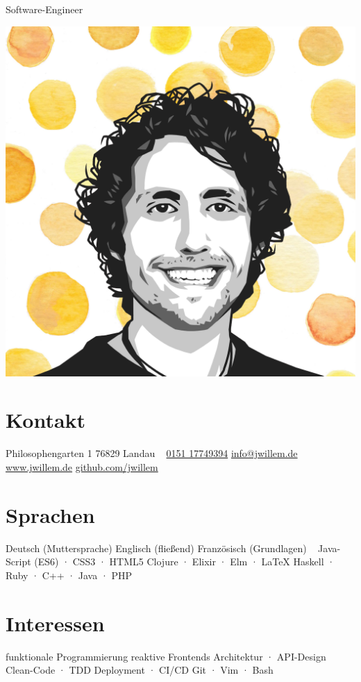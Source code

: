 \documentclass[
]{friggeri-cv}
\begin{document}
       {Software-Engineer}


\begin{aside}
\includegraphics[width=\textwidth]{avatar.png}
  \section{Kontakt}
    Philosophengarten 1
    76829 Landau
    ~
    \href{tel:+4915117749394}{0151 17749394}
    \href{mailto:info@jwillem.de}{info@jwillem.de}
    \href{http://jwillem.de}{www.jwillem.de}
    \href{http://github.com/jwillem}{github.com/jwillem}
  \section{Sprachen}
    Deutsch {\footnotesize{(Muttersprache)}}
    Englisch {\footnotesize{(fließend)}}
    Französisch {\footnotesize{(Grundlagen)}}
    ~
    {\footnotesize Java-Script (ES6) · CSS3 · HTML5}
    {\footnotesize Clojure · Elixir · Elm · \LaTeX}
    {\footnotesize Haskell · Ruby · C++ · Java · PHP}
  \section{Interessen}
  funktionale Programmierung
  reaktive Frontends
  Architektur · API-Design
  Clean-Code · TDD
  Deployment · CI/CD
  Git · Vim · Bash

\end{aside}
\end{document}

